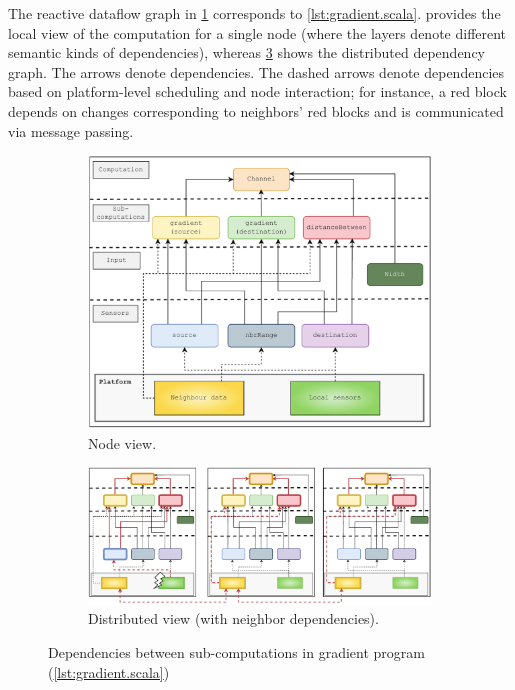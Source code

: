 

The reactive dataflow graph in \cref{fig:gradient-dependencies} corresponds to \cref{lst:gradient.scala}.  provides the local view of the computation for a single node (where the layers denote different semantic kinds of dependencies), whereas \cref{fig:gradient-dependencies-distributed} shows the distributed dependency graph. The arrows denote dependencies. The dashed arrows denote dependencies based on platform-level scheduling and node interaction; for instance, a red block depends on changes corresponding to neighbors' red blocks and is communicated via message passing.

\begin{figure}
    \centering
    \begin{subfigure}[b]{\textwidth}
        \centering
        \includegraphics[width=\textwidth]{figures/gradient-dependencies.png}
        \caption{Node view.}
        \label{fig:gradient-dependencies}
    \end{subfigure}
    \hfill
    \begin{subfigure}[b]{\textwidth}
        \centering
        \includegraphics[width=\textwidth]{figures/gradient-dependencies-distributed.png}
        \caption{Distributed view (with neighbor dependencies).}
        \label{fig:gradient-dependencies-distributed}
    \end{subfigure}
    \caption{Dependencies between sub-computations in gradient program (\cref{lst:gradient.scala})}
\end{figure}

